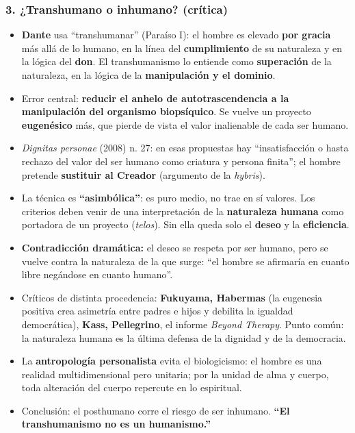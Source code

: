 \documentclass[10pt,a4paper]{article}
\begin{document}
\subsubsection{3. ¿Transhumano o inhumano? (crítica)}
\begin{itemize}
\item \textbf{Dante} usa ``transhumanar'' (Paraíso I): el hombre es elevado \textbf{por gracia} más allá de lo humano, en la línea del \textbf{cumplimiento} de su naturaleza y en la lógica del \textbf{don}. El transhumanismo lo entiende como \textbf{superación} de la naturaleza, en la lógica de la \textbf{manipulación y el dominio}.
\item Error central: \textbf{reducir el anhelo de autotrascendencia a la manipulación del organismo biopsíquico}. Se vuelve un proyecto \textbf{eugenésico} más, que pierde de vista el valor inalienable de cada ser humano.
\item \textit{Dignitas personae} (2008) n. 27: en esas propuestas hay ``insatisfacción o hasta rechazo del valor del ser humano como criatura y persona finita''; el hombre pretende \textbf{sustituir al Creador} (argumento de la \textit{hybris}).
\item La técnica es \textbf{``asimbólica''}: es puro medio, no trae en sí valores. Los criterios deben venir de una interpretación de la \textbf{naturaleza humana} como portadora de un proyecto (\textit{telos}). Sin ella queda solo el \textbf{deseo} y la \textbf{eficiencia}.
\item \textbf{Contradicción dramática:} el deseo se respeta por ser humano, pero se vuelve contra la naturaleza de la que surge: ``el hombre se afirmaría en cuanto libre negándose en cuanto humano''.
\item Críticos de distinta procedencia: \textbf{Fukuyama, Habermas} (la eugenesia positiva crea asimetría entre padres e hijos y debilita la igualdad democrática), \textbf{Kass, Pellegrino}, el informe \textit{Beyond Therapy}. Punto común: la naturaleza humana es la última defensa de la dignidad y de la democracia.
\item La \textbf{antropología personalista} evita el biologicismo: el hombre es una realidad multidimensional pero unitaria; por la unidad de alma y cuerpo, toda alteración del cuerpo repercute en lo espiritual.
\item Conclusión: el posthumano corre el riesgo de ser inhumano. \textbf{``El transhumanismo no es un humanismo.''}
\end{itemize}
\end{document}
